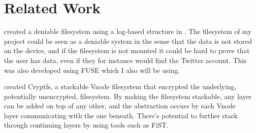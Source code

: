 \section{Related Work}
\citeauthor{petersDEFYDeniableFile2014} created a deniable filesystem using a log-based structure in \citeyear{petersDEFYDeniableFile2014}\cite{petersDEFYDeniableFile2014}. The filesystem of my project could be seen as a deniable system in the sense that the data is not stored on the device, and if the filesystem is not mounted it could be hard to prove that the user has data, even if they for instance would find the Twitter account. This was also developed using FUSE\cite{Libfuse2021} which I also will be using.

\citeauthor{zadokCryptfsStackableVnode} created Cryptfs, a stackable Vnode filesystem that encrypted the underlying, potentially unencrypted, filesystem\cite{zadokCryptfsStackableVnode}. By making the filesystem stackable, any layer can be added on top of any other, and the abstraction occurs by each Vnode layer communicating with the one beneath. There's potential to further stack through continuing layers by using tools such as FiST\cite{FiSTStackableFile}.